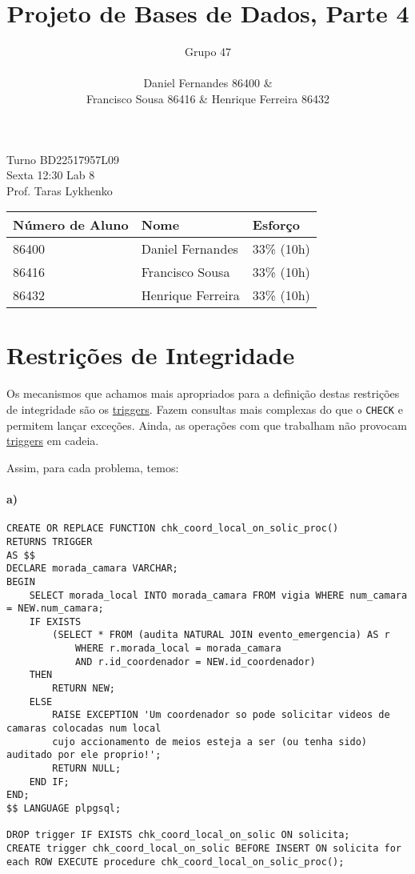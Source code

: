\documentclass[10pt,a4paper]{article}
\author{Grupo 47 \\\\ Daniel Fernandes 86400 \& \\Francisco Sousa 86416 \& Henrique Ferreira 86432}
\title{Projeto de Bases de Dados, Parte 4}
\begin{document}
\maketitle

\begin{center}
Turno BD22517957L09 \\
Sexta 12:30 Lab 8 \\
Prof. Taras Lykhenko \\
\end{center}

\begin{table}[h]
    \centering
    \begin{tabular}{lll}
    \hline
    \textbf{Número de Aluno} & \textbf{Nome} & \textbf{Esforço} \\ \hline
    86400 & Daniel Fernandes & 33\% (10h) \\ \hline
    86416 & Francisco Sousa & 33\% (10h) \\ \hline
    86432 & Henrique Ferreira & 33\% (10h) \\ \hline
    \end{tabular}
\end{table}
\newpage

\section{Restrições de Integridade}

Os mecanismos que achamos mais apropriados para a definição destas restrições
de integridade são os \underline{triggers}. Fazem consultas mais complexas do que o
\texttt{CHECK} e permitem lançar exceções.
Ainda, as operações com que trabalham não provocam \underline{triggers} em cadeia.

Assim, para cada problema, temos:

\paragraph{a)}
\begin{verbatim}
CREATE OR REPLACE FUNCTION chk_coord_local_on_solic_proc() 
RETURNS TRIGGER
AS $$
DECLARE morada_camara VARCHAR;
BEGIN
    SELECT morada_local INTO morada_camara FROM vigia WHERE num_camara = NEW.num_camara;
    IF EXISTS 
        (SELECT * FROM (audita NATURAL JOIN evento_emergencia) AS r
            WHERE r.morada_local = morada_camara
            AND r.id_coordenador = NEW.id_coordenador)
    THEN
        RETURN NEW;
    ELSE
        RAISE EXCEPTION 'Um coordenador so pode solicitar videos de camaras colocadas num local
        cujo accionamento de meios esteja a ser (ou tenha sido) auditado por ele proprio!';
        RETURN NULL;
    END IF;
END;
$$ LANGUAGE plpgsql;

DROP trigger IF EXISTS chk_coord_local_on_solic ON solicita;
CREATE trigger chk_coord_local_on_solic BEFORE INSERT ON solicita for each ROW EXECUTE procedure chk_coord_local_on_solic_proc();
    
\end{verbatim}
\end{document}
